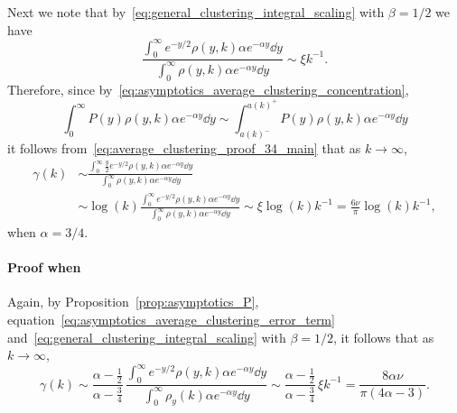 Next we note that by~\eqref{eq:general_clustering_integral_scaling} with $\beta = 1/2$ we have
\[
	\frac{\int_0^\infty e^{-y/2} \rho(y,k) \alpha e^{-\alpha y} \dd y}{\int_0^\infty \rho(y,k) \alpha e^{-\alpha y} \dd y}
	\sim \xi k^{-1}.
\]
Therefore, since by~\eqref{eq:asymptotics_average_clustering_concentration},
\[
	\int_0^\infty P(y) \rho(y,k) \alpha e^{-\alpha y} \dd y \sim \int_{a(k)^-}^{a(k)^+} P(y) \rho(y,k) \alpha e^{-\alpha y} \dd y
\]
it follows from~\eqref{eq:average_clustering_proof_34_main} that as $k \to \infty$,
\begin{align*}
	\gamma(k) &\sim \frac{\int_0^\infty \frac{y}{2} e^{-y/2} \rho(y,k) \alpha e^{-\alpha y} \dd y}
		{\int_0^\infty \rho(y,k) \alpha e^{-\alpha y} \dd y} \\
	&\sim \log(k) \frac{\int_0^\infty e^{-y/2} \rho(y,k) \alpha e^{-\alpha y} \dd y}
	{\int_0^\infty \rho(y,k) \alpha e^{-\alpha y} \dd y}
	\sim \xi \log(k)k^{-1} = \frac{6\nu}{\pi} \log(k) k^{-1},
\end{align*}
when $\alpha = 3/4$.

\paragraph{Proof when }

Again, by Proposition~\ref{prop:asymptotics_P}, equation~\eqref{eq:asymptotics_average_clustering_error_term} and~\eqref{eq:general_clustering_integral_scaling} with $\beta = 1/2$, it follows that as $k \to \infty$,
\[
	\gamma(k) \sim \frac{\alpha - \frac{1}{2}}{\alpha - \frac{3}{4}} \, \frac{\int_0^{\infty} e^{-y/2} \rho(y,k) \alpha  e^{-\alpha y} \dd y} {\int_0^\infty \rho_{y}(k) \alpha e^{-\alpha y} \dd y} 
	\sim \frac{\alpha - \frac{1}{2}}{\alpha - \frac{3}{4}} \, \xi k^{-1} = \frac{8\alpha \nu}{\pi(4\alpha - 3)}.
\]

